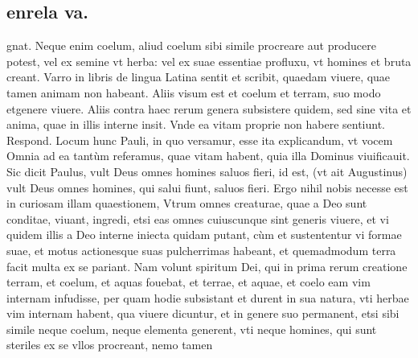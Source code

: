 \documentclass{article}
\begin{document}
\begin{pages}
\section*{enrela va. }
\marginpar{[ p.471 ]}\pstart gnat. Neque enim coelum, aliud coelum sibi simile procreare aut producere potest, vel ex semine vt herba: vel ex suae essentiae profluxu, vt homines et bruta creant. Varro in libris de lingua Latina sentit et scribit, quaedam viuere, quae tamen animam non habeant. Aliis visum est et coelum et terram, suo modo etgenere viuere. Aliis contra haec rerum genera subsistere quidem, sed sine vita et anima, quae in illis interne insit. Vnde ea vitam proprie non habere sentiunt. Respond. Locum hunc Pauli, in quo versamur, esse ita explicandum, vt vocem Omnia ad ea tantùm referamus, quae vitam habent, quia illa Dominus viuificauit. Sic dicit Paulus, vult Deus omnes homines saluos fieri, id est, (vt ait Augustinus) vult Deus omnes homines, qui salui fiunt, saluos fieri. Ergo nihil nobis necesse est in curiosam illam quaestionem, Vtrum omnes creaturae, quae a Deo sunt conditae, viuant, ingredi, etsi eas omnes cuiuscunque sint generis viuere, et vi quidem illis a Deo interne iniecta quidam putant, cùm et sustententur vi formae suae, et motus actionesque suas pulcherrimas habeant, et quemadmodum terra facit multa ex se pariant. Nam volunt spiritum Dei, qui in prima rerum creatione terram, et coelum, et aquas fouebat, et terrae, et aquae, et coelo eam vim internam infudisse, per quam hodie subsistant et durent in sua natura, vti herbae vim internam habent, qua viuere dicuntur, et in genere suo permanent, etsi sibi simile neque coelum, neque elementa generent, vti neque homines, qui sunt steriles ex se vllos procreant, nemo tamen  \pend

\end{pages}
\end{document}
